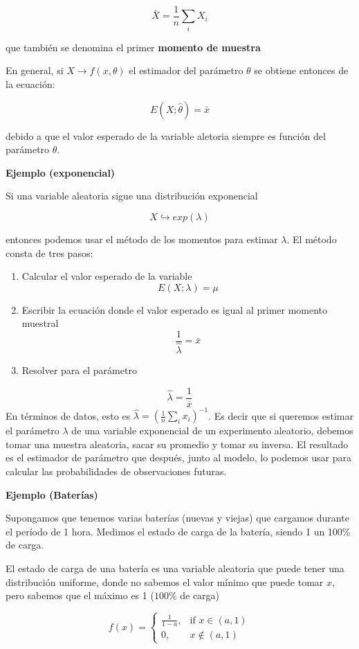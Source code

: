 \documentclass[
]{book}
\begin{document}
\[\bar{X}= \frac{1}{n}\sum_i X_i\]

que también se denomina el primer \textbf{momento de muestra}

En general, si \(X \rightarrow f(x, \theta)\) el estimador del parámetro \(\theta\) se obtiene entonces de la ecuación:

\[E(X; \hat{\theta})=\bar{x}\]

debido a que el valor esperado de la variable aletoria siempre es función del parámetro \(\theta\).

\textbf{Ejemplo (exponencial)}

Si una variable aleatoria sigue una distribución exponencial

\[X \hookrightarrow exp(\lambda)\]

entonces podemos usar el método de los momentos para estimar \(\lambda\). El método consta de tres pasos:

\begin{enumerate}
\def\labelenumi{\arabic{enumi}.}
\item
  Calcular el valor esperado de la variable \[E(X; \lambda)=\mu\]
\item
  Escribir la ecuación donde el valor esperado es igual al primer momento muestral \[\frac{1}{\hat{\lambda}}=\bar{x}\]
\item
  Resolver para el parámetro
\end{enumerate}

\[\hat{\lambda}=\frac{1}{\bar{x}}\]
En términos de datos, esto es \(\hat{\lambda}=(\frac{1}{n}\sum_i x_i)^{-1}\). Es decir que si queremos estimar el parámetro \(\lambda\) de una variable exponencial de un experimento aleatorio, debemos tomar una muestra aleatoria, sacar su promedio y tomar su inversa. El resultado es el estimador de parámetro que después, junto al modelo, lo podemos usar para calcular las probabilidades de observaciones futuras.

\textbf{Ejemplo (Baterías)}

Supongamos que tenemos varias baterías (nuevas y viejas) que cargamos durante el período de 1 hora. Medimos el estado de carga de la batería, siendo 1 un 100\% de carga.

El estado de carga de una batería es una variable aleatoria que puede tener una distribución uniforme, donde no sabemos el valor mínimo que puede tomar \(x\), pero sabemos que el máximo es 1 (\(100\%\) de carga)

\[
f(x)=
\begin{cases}
    \frac{1}{1-a},& \text{if } x\in (a,1)\\
    0,& x\notin (a,1)
\end{cases}
\]
\end{document}

